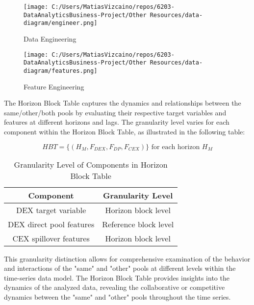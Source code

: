 \documentclass{article}
\begin{document}
{  \begin{figure}[htbp]
    \begin{minipage}{0.5\textwidth}
      \centering
      \texttt{[image: C:/Users/MatiasVizcaino/repos/6203-DataAnalyticsBusiness-Project/Other Resources/data-diagram/engineer.png]}
      \caption{Data Engineering}
      \label{fig:data-diagram-engineer}
    \end{minipage}
    \begin{minipage}{0.45\textwidth}
      \centering
      \texttt{[image: C:/Users/MatiasVizcaino/repos/6203-DataAnalyticsBusiness-Project/Other Resources/data-diagram/features.png]}
      \caption{Feature Engineering}
      \label{fig:data-diagram-features}
    \end{minipage}
  \end{figure}

The Horizon Block Table captures the dynamics and relationships between the same/other/both pools by evaluating their respective target variables and features at different horizons and lags. The granularity level varies for each component within the Horizon Block Table, as illustrated in the following table:

\begin{equation}
  HBT = \{ (H_{M}, F_{DEX}, F_{DP}, F_{CEX}) \} \text{ for each horizon } H_{M} 
  \end{equation}
  

\begin{table}[htbp]
  \centering
  \begin{tabular}{|c|c|}
  \hline
  \textbf{Component} & \textbf{Granularity Level} \\
  \hline
  DEX target variable & Horizon block level \\
  \hline
  DEX direct pool features & Reference block level \\
  \hline
  CEX spillover features & Horizon block level \\
  \hline
  \end{tabular}
  \caption{Granularity Level of Components in Horizon Block Table}
  \label{table:granularity}
\end{table}

This granularity distinction allows for comprehensive examination of the behavior and interactions of the "same" and "other" pools at different levels within the time-series data model. The Horizon Block Table provides insights into the dynamics of the analyzed data, revealing the collaborative or competitive dynamics between the "same" and "other" pools throughout the time series.

}
\end{document}
